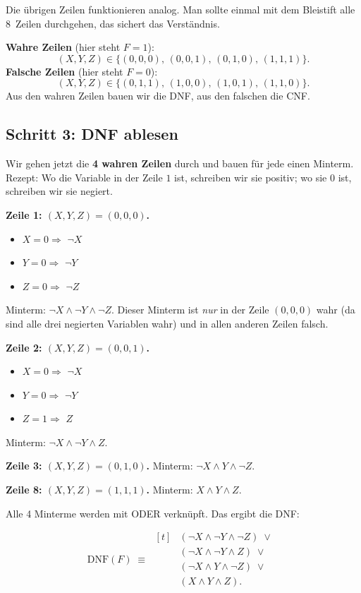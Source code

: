 \documentclass[a4paper,12pt]{article}
\begin{document}
Die \"ubrigen Zeilen funktionieren analog. Man sollte einmal mit dem
Bleistift alle 8~Zeilen durchgehen, das sichert das Verst\"andnis.

\begin{merkbox}
\textbf{Wahre Zeilen} (hier steht $F = 1$):
\[
(X,Y,Z) \in \{(0,0,0),\,(0,0,1),\,(0,1,0),\,(1,1,1)\}.
\]
\textbf{Falsche Zeilen} (hier steht $F = 0$):
\[
(X,Y,Z) \in \{(0,1,1),\,(1,0,0),\,(1,0,1),\,(1,1,0)\}.
\]
Aus den wahren Zeilen bauen wir die DNF, aus den falschen die CNF.
\end{merkbox}

\subsection*{Schritt 3: DNF ablesen}

Wir gehen jetzt die \textbf{4 wahren Zeilen} durch und bauen f\"ur
jede einen Minterm. Rezept: Wo die Variable in der Zeile $1$ ist,
schreiben wir sie positiv; wo sie $0$ ist, schreiben wir sie negiert.

\textbf{Zeile 1: $(X,Y,Z) = (0,0,0)$.}
\begin{itemize}[nosep]
\item $X = 0 \Rightarrow$ $\neg X$
\item $Y = 0 \Rightarrow$ $\neg Y$
\item $Z = 0 \Rightarrow$ $\neg Z$
\end{itemize}
Minterm: $\neg X \wedge \neg Y \wedge \neg Z$. Dieser Minterm ist
\emph{nur} in der Zeile $(0,0,0)$ wahr (da sind alle drei negierten
Variablen wahr) und in allen anderen Zeilen falsch.

\textbf{Zeile 2: $(X,Y,Z) = (0,0,1)$.}
\begin{itemize}[nosep]
\item $X = 0 \Rightarrow$ $\neg X$
\item $Y = 0 \Rightarrow$ $\neg Y$
\item $Z = 1 \Rightarrow$ $Z$
\end{itemize}
Minterm: $\neg X \wedge \neg Y \wedge Z$.

\textbf{Zeile 3: $(X,Y,Z) = (0,1,0)$.}
Minterm: $\neg X \wedge Y \wedge \neg Z$.

\textbf{Zeile 8: $(X,Y,Z) = (1,1,1)$.}
Minterm: $X \wedge Y \wedge Z$.

Alle 4 Minterme werden mit ODER verkn\"upft. Das ergibt die DNF:

\begin{merkbox}[title={Ergebnis: DNF}]
\[
\text{DNF}(F) \;\equiv\; \begin{aligned}[t]
  &(\neg X \wedge \neg Y \wedge \neg Z) \;\vee\; \\
  &(\neg X \wedge \neg Y \wedge Z) \;\vee\; \\
  &(\neg X \wedge Y \wedge \neg Z) \;\vee\; \\
  &(X \wedge Y \wedge Z).
\end{aligned}
\]
\end{merkbox}
\end{document}
